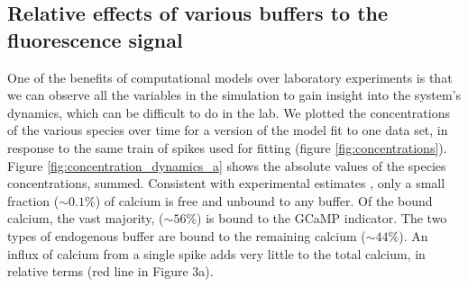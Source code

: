\documentclass[a4paper,12pt]{article}
\theoremstyle{definition}
\begin{document}
\subsection{Relative effects of various buffers to the fluorescence signal}
One of the benefits of computational models over laboratory experiments is that we can observe all the variables in the simulation to gain insight into the system’s dynamics, which can be difficult to do in the lab. We plotted the concentrations of the various species over time for a version of the model fit to one data set, in response to the same train of spikes used for fitting (figure \ref{fig:concentrations}). Figure \ref{fig:concentration_dynamics_a} shows the absolute values of the species concentrations, summed. Consistent with experimental estimates \cite{maravall}, only a small fraction ($\sim 0.1\%$) of calcium is free and unbound to any buffer. Of the bound calcium, the vast majority, ($\sim 56\%$) is bound to the GCaMP indicator. The two types of endogenous buffer are bound to the remaining calcium ($\sim 44\%$). An influx of calcium from a single spike adds very little to the total calcium, in relative terms (red line in Figure 3a).
\end{document}
